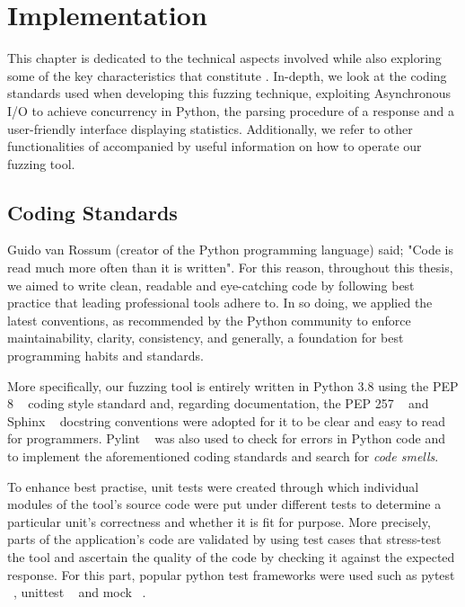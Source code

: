 \chapter{Implementation}
\label{sec:implementation}
\minitoc
\vspace*{1cm}

This chapter is dedicated to the technical aspects involved while also exploring some of the key characteristics that constitute \pname{}. In-depth, we look at the coding standards used when developing this fuzzing technique, exploiting Asynchronous I/O to achieve concurrency in Python, the parsing procedure of a response and a user-friendly interface displaying statistics. Additionally, we refer to other functionalities of \pname{} accompanied by useful information on how to operate our fuzzing tool.

\section{Coding Standards}
Guido van Rossum (creator of the Python programming language) said; "Code is read much more often than it is written". For this reason, throughout this thesis, we aimed to write clean, readable and eye-catching code by following best practice that leading professional tools adhere to. In so doing, we applied the latest conventions, as recommended by the Python community to enforce maintainability, clarity, consistency, and generally, a foundation for best programming habits and standards. 

More specifically, our fuzzing tool is entirely written in Python 3.8 using the PEP 8 ~\cite{python_pep8} coding style standard and, regarding documentation, the PEP 257 ~\cite{python_pep257} and Sphinx ~\cite{sphinx} docstring conventions were adopted for it to be clear and easy to read for programmers. Pylint ~\cite{pylint_module} was also used to check for errors in Python code and to implement the aforementioned coding standards and search for \emph{code smells}.

To enhance best practise, unit tests were created through which individual modules of the tool's source code were put under different tests to determine a particular unit's correctness and whether it is fit for purpose. More precisely, parts of the application's code are validated by using test cases that stress-test the tool and ascertain the quality of the code by checking it against the expected response. For this part, popular python test frameworks were used such as pytest ~\cite{pytest_module}, unittest ~\cite{unittest_module} and mock ~\cite{mock}.

